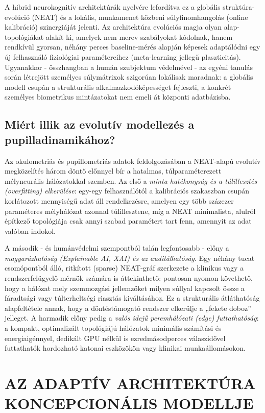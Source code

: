 \documentclass[12pt,a4paper,oneside]{book}
\begin{document}
A hibrid neurokognitív architektúrák nyelvére lefordítva ez a globális struktúra-evolúció (NEAT) és a lokális, munkamenet közbeni súlyfinomhangolás (online kalibráció) szinergiáját jelenti. Az architektúra evolúciós magja olyan alap-topológiákat alakít ki, amelyek nem merev szabályokat kódolnak, hanem rendkívül gyorsan, néhány perces baseline-mérés alapján képesek adaptálódni egy új felhasználó fiziológiai paramétereihez (meta-learning jellegű plaszticitás). Ugyanakkor - összhangban a humán szubjektum védelmével - az egyéni tanulás során létrejött személyes súlymátrixok szigorúan lokálisak maradnak: a globális modell csupán a strukturális alkalmazkodóképességet fejleszti, a konkrét személyes biometrikus mintázatokat nem emeli át központi adatbázisba.

\subsection{Miért illik az evolutív modellezés a pupilladinamikához?}

Az okulometriás és pupillometriás adatok feldolgozásában a NEAT-alapú evolutív megközelítés három döntő előnnyel bír a hatalmas, túlparaméterezett mélyneurális hálózatokkal szemben. Az első a \emph{minta-hatékonyság és a túlillesztés (overfitting) elkerülése}: egy-egy felhasználótól a kalibrációs szakaszban csupán korlátozott mennyiségű adat áll rendelkezésre, amelyen egy több százezer paraméteres mélyhálózat azonnal túlillesztene, míg a NEAT minimalista, alulról építkező topológiája csak annyi szabad paramétert tart fenn, amennyit az adat valóban indokol.

A második - és humánvédelmi szempontból talán legfontosabb - előny a \emph{magyarázhatóság (Explainable AI, XAI) és az auditálhatóság}. Egy néhány tucat csomópontból álló, ritkított (sparse) NEAT-gráf szerkezete a klinikus vagy a rendszerfelügyelő mérnök számára is áttekinthető: pontosan nyomon követhető, hogy a hálózat mely szemmozgási jellemzőket milyen súllyal kapcsolt össze a fáradtsági vagy túlterheltségi riasztás kiváltásához. Ez a strukturális átláthatóság alapfeltétele annak, hogy a döntéstámogató rendszer elkerülje a „fekete doboz” jelleget. A harmadik előny pedig a \emph{valós idejű peremhálózati (edge) futtathatóság}: a kompakt, optimalizált topológiájú hálózatok minimális számítási és energiaigénnyel, dedikált GPU nélkül is ezredmásodperces válaszidővel futtathatók hordozható katonai eszközökön vagy klinikai munkaállomásokon.

\section{AZ ADAPTÍV ARCHITEKTÚRA KONCEPCIONÁLIS MODELLJE}
\end{document}
